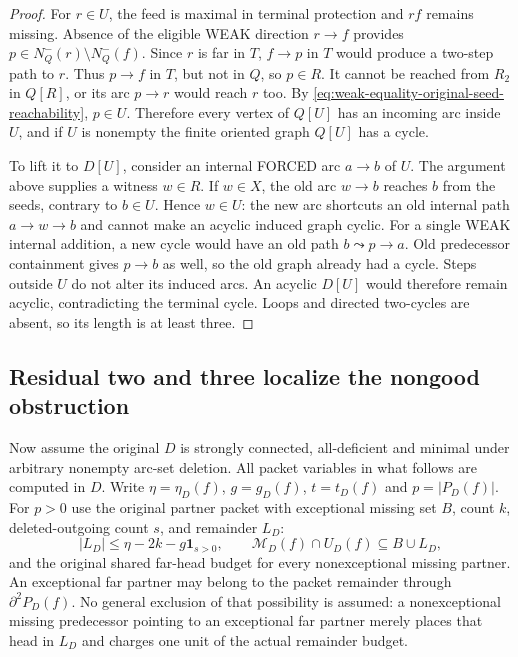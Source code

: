 \begin{proof}
For $r\in U$, the feed is maximal in terminal protection and $rf$
remains missing. Absence of the eligible WEAK direction $r\to f$
provides $p\in N_Q^-(r)\setminus N_Q^-(f)$. Since $r$ is far in $T$,
$f\to p$ in $T$ would produce a two-step path to $r$. Thus $p\to f$
in $T$, but not in $Q$, so $p\in R$. It cannot be reached from
$R_2$ in $Q[R]$, or its arc $p\to r$ would reach $r$ too.
By \eqref{eq:weak-equality-original-seed-reachability}, $p\in U$.
Therefore every vertex of $Q[U]$ has an incoming arc inside $U$,
and if $U$ is nonempty the finite oriented graph $Q[U]$ has a cycle.

To lift it to $D[U]$, consider an internal FORCED arc $a\to b$ of
$U$. The argument above supplies a witness $w\in R$.
If $w\in X$, the old arc $w\to b$ reaches $b$ from the seeds,
contrary to $b\in U$. Hence $w\in U$: the new arc shortcuts an
old internal path $a\to w\to b$ and cannot make an acyclic induced
graph cyclic. For a single WEAK internal addition, a new cycle would
have an old path $b\leadsto p\to a$. Old predecessor containment
gives $p\to b$ as well, so the old graph already had a cycle.
Steps outside $U$ do not alter its induced arcs. An acyclic $D[U]$
would therefore remain acyclic, contradicting the terminal cycle.
Loops and directed two-cycles are absent, so its length is at least
three.
\end{proof}

\subsection{Residual two and three localize the nongood obstruction}

Now assume the original $D$ is strongly connected, all-deficient and
minimal under arbitrary nonempty arc-set deletion. All packet variables
in what follows are computed in $D$. Write $\eta=\eta_D(f)$,
$g=g_D(f)$, $t=t_D(f)$ and $p=|P_D(f)|$.
For $p>0$ use the original partner packet with exceptional missing set
$B$, count $k$, deleted-outgoing count $s$, and remainder $L_D$:
\[
 |L_D|\le\eta-2k-g\mathbf1_{s>0},\qquad
 \mathcal M_D(f)\cap U_D(f)\subseteq B\cup L_D,
\]
and the original shared far-head budget for every nonexceptional
missing partner. An exceptional far partner may belong to the packet
remainder through $\partial^2P_D(f)$. No general exclusion of that
possibility is assumed: a nonexceptional missing predecessor pointing
to an exceptional far partner merely places that head in $L_D$ and
charges one unit of the actual remainder budget.

